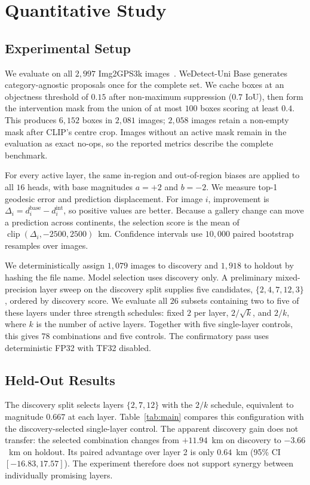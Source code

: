 \section{Quantitative Study}
\label{sec:experiments}

\subsection{Experimental Setup}

We evaluate on all $2{,}997$ Img2GPS3k images~\cite{vo2017revisiting}.
WeDetect-Uni Base generates category-agnostic proposals once for the complete
set. We cache boxes at an objectness threshold of $0.15$ after non-maximum
suppression ($0.7$ IoU), then form the intervention mask from the union of at
most $100$ boxes scoring at least $0.4$. This produces $6{,}152$ boxes in
$2{,}081$ images; $2{,}058$ images retain a non-empty mask after CLIP's centre
crop. Images without an active mask remain in the evaluation as exact no-ops,
so the reported metrics describe the complete benchmark.

For every active layer, the same in-region and out-of-region biases are applied
to all $16$ heads, with base magnitudes $a=+2$ and $b=-2$. We measure top-1
geodesic error and
prediction displacement. For image $i$, improvement is
$\Delta_i=d_i^{\mathrm{base}}-d_i^{\mathrm{int}}$, so positive values are
better. Because a gallery change can move a prediction across continents, the
selection score is the mean of
$\operatorname{clip}(\Delta_i,-2500,2500)$~km. Confidence intervals use
$10{,}000$ paired bootstrap resamples over images.

We deterministically assign $1{,}079$ images to discovery and $1{,}918$ to
holdout by hashing the file name. Model selection uses discovery only. A
preliminary mixed-precision layer sweep on the discovery split supplies five candidates,
$\{2,4,7,12,3\}$, ordered by discovery score. We evaluate all $26$ subsets containing two to five of
these layers under three strength schedules: fixed $2$ per layer,
$2/\sqrt{k}$, and $2/k$, where $k$ is the number of active layers. Together
with five single-layer controls, this gives $78$ combinations and five
controls. The confirmatory pass uses deterministic FP32 with TF32 disabled.

\subsection{Held-Out Results}

The discovery split selects layers $\{2,7,12\}$ with the $2/k$ schedule,
equivalent to magnitude $0.667$ at each layer. Table~\ref{tab:main} compares
this configuration with the discovery-selected single-layer control. The
apparent discovery gain does not transfer: the selected combination changes
from $+11.94$~km on discovery to $-3.66$~km on holdout. Its paired advantage
over layer 2 is only $0.64$~km (95\% CI $[-16.83,17.57]$). The experiment
therefore does not support synergy between individually promising layers.

